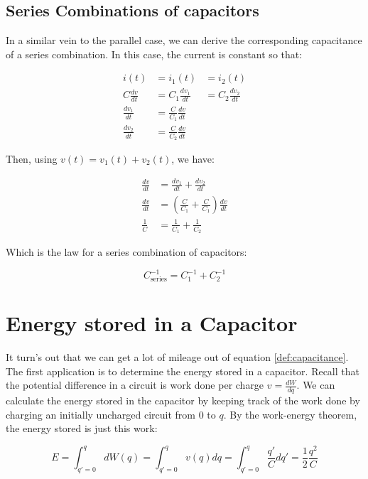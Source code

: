 \documentclass{tufte-book}
\begin{document}
\subsection{Series Combinations of capacitors}
In a similar vein to the parallel case, we can derive the corresponding capacitance of a series combination. In this case, the current is constant so that:

\begin{eqnarray*}
i(t)  &= i_1(t) &= i_2(t) \\
C\frac{dv}{dt}  &= C_1\frac{dv_1}{dt}             &= C_2\frac{dv_2}{dt} \\
\frac{dv_1}{dt} &= \frac{C}{C_1}\frac{dv}{dt}  & \\
\frac{dv_2}{dt} &= \frac{C}{C_2}\frac{dv}{dt}  &
\end{eqnarray*}

\noindent Then, using $v(t) = v_1(t) + v_2(t)$, we have:


\begin{align*}
\frac{dv}{dt} &= \frac{dv_1}{dt} + \frac{dv_2}{dt} \\
\frac{dv}{dt} &= \left(\frac{C}{C_1}+\frac{C}{C_1}\right)\frac{dv}{dt}\\
\frac{1}{C}&= \frac{1}{C_1} + \frac{1}{C_2}
\end{align*}

\noindent Which is the law for a series combination of capacitors:

\begin{equation}\label{eq:series_cap}
\boxed{C^{-1}_{\text{series}} = C^{-1}_1+C^{-1}_2}
\end{equation}


\section{Energy stored in a Capacitor}
It turn's out that we can get a lot of mileage out of equation \ref{def:capacitance}. The first application is to determine the energy stored in a capacitor. Recall that the potential difference in a circuit is work done per charge $v = \frac{dW}{dq}$. We can calculate the energy stored in the capacitor by keeping track of the work done by charging an initially uncharged circuit from $0$ to $q$. By the work-energy theorem, the energy stored is just this work:

$$
E = \int_{q\prime=0}^{q} dW(q) =\int_{q\prime=0}^{q} v(q)dq = \int_{q\prime=0}^{q} \frac{q\prime}{C}dq\prime=\frac{1}{2}\frac{q^2}{C} 
$$
\end{document}
